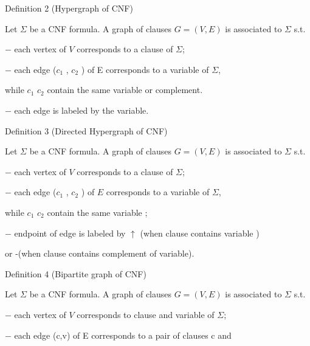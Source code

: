 \documentclass[runningheads,a4paper]{llncs}
\begin{document}
\noindent \newline Definition 2 (Hypergraph of CNF)

\noindent Let $\Sigma$ be a CNF formula. A graph of clauses $G=(V,E)$ is associated to $\Sigma$ s.t.

\setlength{\parindent}{4em}  $-$ each vertex of $V$ corresponds to a clause of  $\Sigma$;

\setlength{\parindent}{4em}  $-$ each edge ($c_1$ , $c_2$ ) of E corresponds to a variable of $\Sigma$, 

\setlength{\parindent}{5em} while $c_1$ $c_2$ contain the same variable or complement.

\setlength{\parindent}{4em}  $-$ each edge is labeled by the variable.
 
\noindent \newline Definition 3 (Directed Hypergraph of CNF)

\noindent Let $\Sigma$ be a CNF formula. A graph of clauses $G=(V,E)$ is associated to $\Sigma$ s.t.

\setlength{\parindent}{4em} $-$ each vertex of $V$ corresponds to a clause of $\Sigma$;

\setlength{\parindent}{4em} $-$ each edge ($c_1$ , $c_2$ ) of $E$ corresponds to a variable of $\Sigma$,

\setlength{\parindent}{5em} while $c_1$ $c_2$ contain the same variable ;

\setlength{\parindent}{4em} $-$ endpoint of edge is labeled by $\uparrow$ (when clause contains variable ) 

\setlength{\parindent}{5em} or -(when clause contains complement of variable).

\noindent \newline Definition 4 (Bipartite graph of CNF)

\noindent Let $\Sigma$ be a CNF formula. A graph of clauses $G=(V,E)$ is associated to $\Sigma$ s.t.

\setlength{\parindent}{4em} $-$ each vertex of $V$ corresponds to clause and variable of $\Sigma$;

\setlength{\parindent}{4em} $-$ each edge (c,v) of E corresponds to a pair of clauses c and
\end{document}
